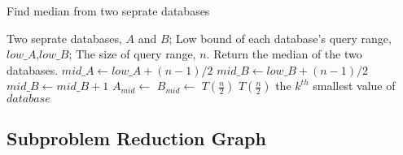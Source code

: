 \documentclass[UTF8,a4paper]{article}
\begin{document}
	\begin{algorithm}[htb]
		\caption{Find median from two seprate databases}
		\begin{algorithmic}[1]
			\Require
			Two seprate databases, $A$ and $B$;
			Low bound of each database's query range, $low\_A$,$low\_B$;
			The size of query range, $n$.
			\Ensure
			Return the median of the two databases.
				\State $mid\_A \gets low\_A + (n-1)/2 $
				\State $mid\_B \gets low\_B + (n-1)/2 $
					\State $mid\_B \gets mid\_B + 1$
				\EndIf
				\State $A_{mid} \gets $
				\State $B_{mid} \gets $
					\State {}
					\State \Return {}
					\State \Return {}
					\textbf{\color{red}$ T(\frac{n}{2}) $}
				\Else 
					\State \Return {}
					\textbf{\color{red}$ T(\frac{n}{2}) $}
				\EndIf
			\EndFunction
			\State
				\State \Return the $k^{th}$ smallest value of $database$
			\EndFunction
		\end{algorithmic}
	\end{algorithm}

	\subsection{Subproblem Reduction Graph}
	
\end{document}
